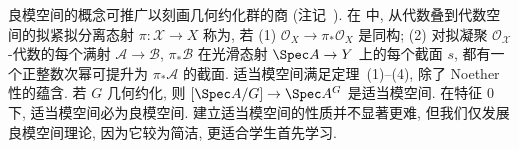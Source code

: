 \begin{remark}[适当模空间]\label{src:7.5.14}
良模空间的概念可推广以刻画几何约化群的商 (注记~). 在 \cite{Alp14} 中, 从代数叠到代数空间的拟紧拟分离态射 $\pi:\mathcal X\to X$ 称为, 若 (1) $\mathcal O_X\to\pi_*\mathcal O_X$ 是同构; (2) 对拟凝聚 $\mathcal O_{\mathcal X}$-代数的每个满射 $\mathcal A\to\mathcal B$, $\pi_*\mathcal B$ 在光滑态射 $\Spec A\to\mathcal Y$ 上的每个截面 $s$, 都有一个正整数次幂可提升为 $\pi_*\mathcal A$ 的截面. 适当模空间满足定理~(1)--(4), 除了 Noether 性的蕴含. 若 $G$ 几何约化, 则 $[\Spec A/G]\to\Spec A^G$ 是适当模空间. 在特征 $0$ 下, 适当模空间必为良模空间. 建立适当模空间的性质并不显著更难, 但我们仅发展良模空间理论, 因为它较为简洁, 更适合学生首先学习.
\end{remark}

